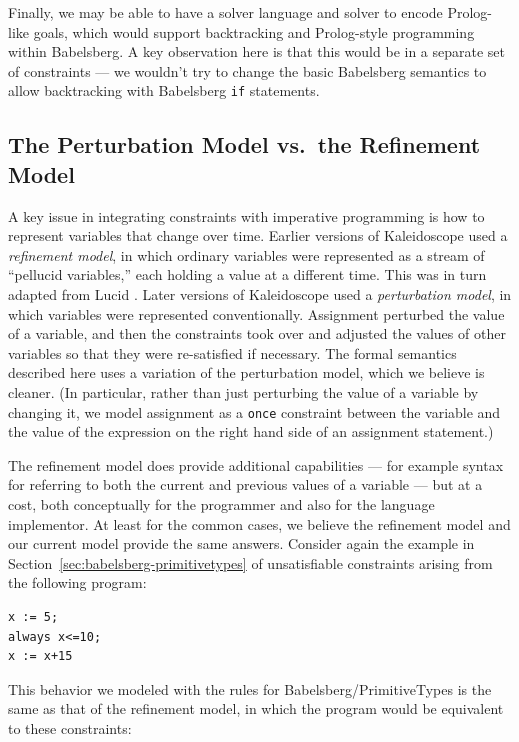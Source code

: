 \documentclass{article}
\begin{document}
Finally, we may be able to have a solver language and solver to encode
Prolog-like goals, which would support backtracking and Prolog-style
programming within Babelsberg.  A key observation here is that this
would be in a separate set of constraints --- we wouldn't try to
change the basic Babelsberg semantics to allow backtracking with
Babelsberg \verb|if| statements.

\subsection{The Perturbation Model vs.\ the Refinement Model}
\label{sec:perturbation-vs-refinement}

A key issue in integrating constraints with imperative programming is
how to represent variables that change over time.  Earlier versions of
Kaleidoscope
\cite{freeman-benson-phd,freeman-benson-iccl-1992,freeman-benson-ecoop-1992}
used a \emph{refinement model}, in which ordinary variables were
represented as a stream of ``pellucid variables,'' each holding a
value at a different time.  This was in turn adapted from Lucid
\cite{ashcroft-cacm-1977}.  Later versions of Kaleidoscope
\cite{lopez-ecoop-1994} used a \emph{perturbation model}, in which
variables were represented conventionally.  Assignment perturbed the
value of a variable, and then the constraints took over and adjusted
the values of other variables so that they were re-satisfied if
necessary.  The formal semantics described here uses a variation of
the perturbation model, which we believe is cleaner.  (In particular,
rather than just perturbing the value of a variable by changing it, we
model assignment as a \verb|once| constraint between the variable and
the value of the expression on the right hand side of an assignment
statement.)

The refinement model does provide additional capabilities --- for
example syntax for referring to both the current and previous values
of a variable --- but at a cost, both conceptually for the programmer
and also for the language implementor.  At least for the common cases,
we believe the refinement model and our current model provide the same
answers.  Consider again the example in
Section~\ref{sec:babelsberg-primitivetypes} of unsatisfiable
constraints arising from the following program:

\begin{verbatim}
x := 5;
always x<=10;
x := x+15
\end{verbatim}

This behavior we modeled with the rules for Babelsberg/PrimitiveTypes
is the same as that of the refinement model, in which the program
would be equivalent to these constraints:
\end{document}
